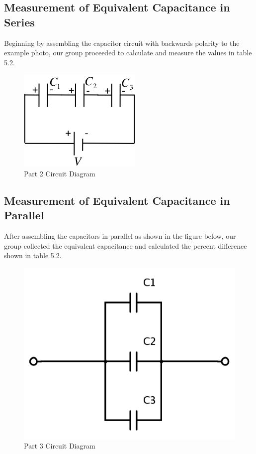 \documentclass[titlepage]{article}
\begin{document}
        \subsection{Measurement of Equivalent Capacitance in Series}
        Beginning by assembling the capacitor circuit with backwards polarity to the example photo, our group proceeded to calculate and measure the values in table 5.2.\\ 

        \begin{figure}[hbt!] 
            \centering
            \caption*{Part 2 Circuit Diagram}
            \includegraphics{images/procedure/part2.png}
        \end{figure} 

        \subsection{Measurement of Equivalent Capacitance in Parallel}
        After assembling the capacitors in parallel as shown in the figure below, our group collected the equivalent capacitance and calculated the percent difference shown in table 5.2.

        \begin{figure}[hbt!] 
            \centering
            \caption*{Part 3 Circuit Diagram}
            \includegraphics[scale=0.5]{images/procedure/part3.png}
        \end{figure} 
\end{document}
